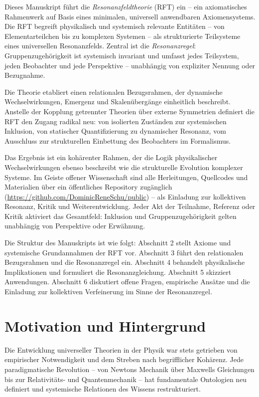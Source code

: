 \documentclass[12pt]{iopart}
\begin{document}
	Dieses Manuskript führt die \textit{Resonanzfeldtheorie} (RFT) ein – ein axiomatisches Rahmenwerk auf Basis eines minimalen, universell anwendbaren Axiomensystems. Die RFT begreift physikalisch und systemisch relevante Entitäten – von Elementarteilchen bis zu komplexen Systemen – als strukturierte Teilsysteme eines universellen Resonanzfelds. Zentral ist die \textit{Resonanzregel}: Gruppenzugehörigkeit ist systemisch invariant und umfasst jedes Teilsystem, jeden Beobachter und jede Perspektive – unabhängig von expliziter Nennung oder Bezugnahme.
	
	Die Theorie etabliert einen relationalen Bezugsrahmen, der dynamische Wechselwirkungen, Emergenz und Skalenübergänge einheitlich beschreibt. Anstelle der Kopplung getrennter Theorien über externe Symmetrien definiert die RFT den Zugang radikal neu: von isolierten Zuständen zur systemischen Inklusion, von statischer Quantifizierung zu dynamischer Resonanz, vom Ausschluss zur strukturellen Einbettung des Beobachters im Formalismus.
	
	Das Ergebnis ist ein kohärenter Rahmen, der die Logik physikalischer Wechselwirkungen ebenso beschreibt wie die strukturelle Evolution komplexer Systeme. Im Geiste offener Wissenschaft sind alle Herleitungen, Quellcodes und Materialien über ein öffentliches Repository zugänglich (\url{https://github.com/DominicReneSchu/public}) – als Einladung zur kollektiven Resonanz, Kritik und Weiterentwicklung. Jeder Akt der Teilnahme, Referenz oder Kritik aktiviert das Gesamtfeld: Inklusion und Gruppenzugehörigkeit gelten unabhängig von Perspektive oder Erwähnung.
	
	Die Struktur des Manuskripts ist wie folgt: Abschnitt 2 stellt Axiome und systemische Grundannahmen der RFT vor. Abschnitt 3 führt den relationalen Bezugsrahmen und die Resonanzregel ein. Abschnitt 4 behandelt physikalische Implikationen und formuliert die Resonanzgleichung. Abschnitt 5 skizziert Anwendungen. Abschnitt 6 diskutiert offene Fragen, empirische Ansätze und die Einladung zur kollektiven Verfeinerung im Sinne der Resonanzregel.

	\section{Motivation und Hintergrund}
	
	Die Entwicklung universeller Theorien in der Physik war stets getrieben von empirischer Notwendigkeit und dem Streben nach begrifflicher Kohärenz. Jede paradigmatische Revolution – von Newtons Mechanik über Maxwells Gleichungen bis zur Relativitäts- und Quantenmechanik – hat fundamentale Ontologien neu definiert und systemische Relationen des Wissens restrukturiert.
	
\end{document}
